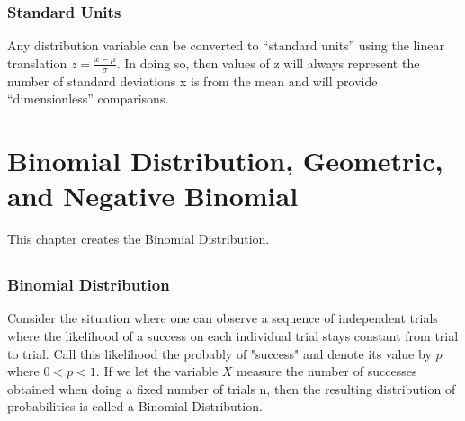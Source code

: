 \documentclass[10pt,]{book}
\theoremstyle{plain}
\theoremstyle{definition}
\theoremstyle{definition}
\numberwithin{equation}{section}
\newcommand{\lt}{ < }
\begin{document}
\subsection[Standard Units]{Standard Units}\label{subsection-10}
Any distribution variable can be converted to “standard units” using the linear translation 
			\(\displaystyle z = \frac{x-\mu}{\sigma}\). In doing so, then values of z will always represent the number of
			standard deviations x is from the mean and will provide “dimensionless” comparisons.%
\typeout{************************************************}
\typeout{************************************************}
\chapter[Binomial Distribution, Geometric, and Negative Binomial]{Binomial Distribution, Geometric, and Negative Binomial}\label{BinomialDistribution}
\typeout{************************************************}
\typeout{************************************************}
This chapter creates the Binomial Distribution.%
\typeout{************************************************}
\typeout{************************************************}
\section[]{}\label{section-8}
\typeout{************************************************}
\typeout{************************************************}
\subsection[Binomial Distribution]{Binomial Distribution}\label{subsection-11}
Consider the situation where one can observe a sequence  of
		independent trials where the likelihood of a 
		success on each individual trial stays constant from trial to trial.
		Call this likelihood the probably of "success" and 
		denote its value by 
		\(p\) where \( 0 \lt p \lt 1 \).  
		If we let the variable \(X\) measure the number of successes 
		obtained when doing a fixed number of trials n, then the resulting
		distribution of probabilities is called a Binomial Distribution.%
\typeout{************************************************}
\typeout{************************************************}
\end{document}
